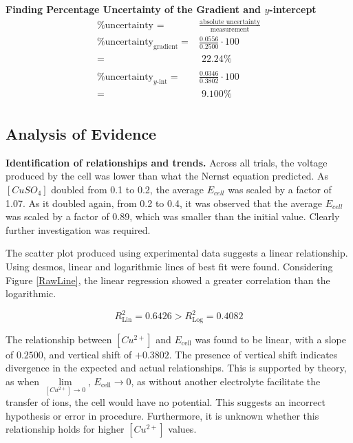 \documentclass[10.5pt,a4paper]{article}
\begin{document}
\textbf{Finding Percentage Uncertainty of the Gradient and $y$-intercept}\newline
\begin{align*}
	\textrm{\% uncertainty }=&\frac{\textrm{absolute uncertainty}}{\textrm{measurement}}\\
	\textrm{\% uncertainty}_\textrm{gradient}=&\frac{0.0556}{0.2500}\cdot100\\
	=&\;22.24\%\\
	\\
	\textrm{\% uncertainty}_\textrm{$y$-int}=&\frac{0.0346}{0.3802}\cdot100\\
	=&\;9.100\%\\
\end{align*}

\subsection{Analysis of Evidence}
\textbf{Identification of relationships and trends.}\newline
Across all trials, the voltage produced by the cell was lower than what the Nernst equation predicted. As $[CuSO_4]$ doubled from 0.1 to 0.2, the average $E_{cell}$ was scaled by a factor of 1.07. As it doubled again, from 0.2 to 0.4,  it was observed that the average $E_{cell}$  was scaled by a factor of $0.89$, which was smaller than the initial value. Clearly further investigation was required.
\vspace{.25cm}


The scatter plot produced using experimental data suggests a linear relationship. Using desmos, linear and logarithmic lines of best fit were found. Considering Figure \ref{RawLine}, the linear regression showed a greater correlation than the logarithmic.

$$R^2_\textrm{Lin}=0.6426>R^2_\textrm{Log}=0.4082$$



The relationship between $[Cu^{2+}]$ and $E_\textrm{cell}$ was found to be linear, with a slope of $0.2500$, and vertical shift of $+0.3802$. The presence of vertical shift indicates divergence in the expected and actual relationships.  This is supported by theory, as when $\lim\limits_{[Cu^{2+}]\rightarrow 0}$, $E_\textrm{cell}\rightarrow 0$, as without another electrolyte facilitate the transfer of ions, the cell would have no potential. This suggests an incorrect hypothesis or error in procedure. Furthermore, it is unknown whether this relationship holds for higher $[Cu^{2+}]$ values. \cite{UCSBPhysicsCite} 
\end{document}
